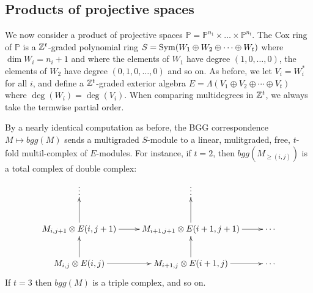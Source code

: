 \documentclass[twoside,12pt, leqno]{amsart}
\def\PP{{\mathbb P}}
\DeclareMathOperator{\rH}{{\rm H}}
\def\bT{{\bf T}}
\def\bU{{\bf U}}
\def\rH{{\rm H}}
\begin{document}
% 
% 

\subsection{Products of projective spaces}
We now consider a product of projective spaces $\PP = \PP^{n_1}\times \ldots \times \PP^{n_{t}}$.  The Cox ring of $\PP$ is a ${\mathbb Z}^{t}$-graded polynomial ring $S=\operatorname{Sym} (W_1\oplus W_2 \oplus \cdots \oplus W_t)$ where $\dim W_i=n_i+1$ and where the elements of $W_1$ have degree $(1,0,\dots,0)$, the elements of $W_2$ have degree $(0,1,0,\dots,0)$ and so on.  As before, we let $V_i=W_i^*$ for all $i$, and define a ${\mathbb Z}^{t}$-graded exterior algebra $E=\Lambda (V_1\oplus V_2\oplus \cdots \oplus V_t)$ where $\deg(W_i)=\deg(V_i)$.  When comparing multidegrees in ${\mathbb Z}^t$, we always take the termwise partial order.  

By a nearly identical computation as before, the BGG correspondence $M\mapsto bgg(M)$ sends a multigraded $S$-module to a linear, mulitgraded, free, $t$-fold multil-complex of $E$-modules.  For instance, if $t=2$, then $bgg(M_{\ge(i,j)})$ is a total complex of  double complex:
\begin{equation}\label{eqn:uppercorner}
\xymatrix{ \vdots & \vdots & \\
 M_{i,j+1}\otimes E(i,j+1) \ar[r]\ar[u]& M_{i+1,j+1}\otimes E(i+1,j+1)\ar[u] \ar[r] & \cdots \\
 M_{i,j}\otimes E(i,j) \ar[r]\ar[u]& M_{i+1,j}\otimes E(i+1,j) \ar[u]  \ar[r] & \cdots \\
}
\end{equation}
If $t=3$ then $bgg(M)$ is a triple complex, and so on.
\end{document}

